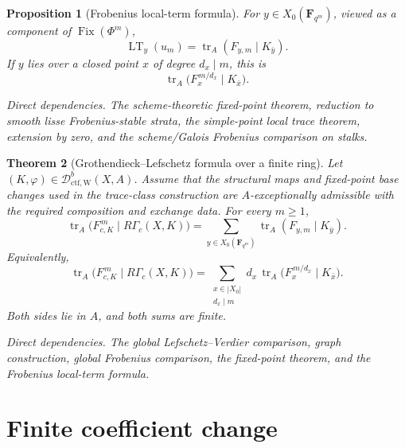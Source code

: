 \documentclass[10pt]{article}
\newtheorem{theorem}{Theorem}[section]
\newtheorem{proposition}[theorem]{Proposition}
\theoremstyle{definition}
\newcommand{\DctfW}{\mathcal D^b_{\mathrm{ctf},\mathrm W}}
\newcommand{\Fix}{\operatorname{Fix}}
\newcommand{\RGammac}{R\Gamma_c}
\newcommand{\depends}[1]{\par\smallskip\noindent\textit{Direct dependencies.} #1\par}
\begin{document}
\begin{proposition}[Frobenius local-term formula]
For \(y\in X_0(\mathbf F_{q^m})\), viewed as a component of
\(\Fix(\Phi^m)\),
\[
 \operatorname{LT}_y(u_m)=
 \operatorname{tr}_A(F_{y,m}\mid K_{\bar y}).
\]
If \(y\) lies over a closed point \(x\) of degree \(d_x\mid m\), this is
\[
 \operatorname{tr}_A
 \bigl(F_x^{\,m/d_x}\mid K_{\bar x}\bigr).
\]
\depends{The scheme-theoretic fixed-point theorem, reduction to smooth lisse
Frobenius-stable strata, the simple-point local trace theorem, extension by
zero, and the scheme/Galois Frobenius comparison on stalks.}
\end{proposition}

\begin{theorem}[Grothendieck--Lefschetz formula over a finite ring]
Let \((K,\varphi)\in\DctfW(X,A)\).  Assume that the structural maps and
fixed-point base changes used in the trace-class construction are
\(A\)-exceptionally admissible with the required composition and exchange
data.  For every \(m\geq1\),
\[
 \boxed{
 \operatorname{tr}_A
 \bigl(F_{c,K}^{\,m}\mid\RGammac(X,K)\bigr)
 =
 \sum_{y\in X_0(\mathbf F_{q^m})}
 \operatorname{tr}_A(F_{y,m}\mid K_{\bar y}).}
\]
Equivalently,
\[
 \operatorname{tr}_A
 \bigl(F_{c,K}^{\,m}\mid\RGammac(X,K)\bigr)
 =
 \sum_{\substack{x\in|X_0|\\d_x\mid m}}
 d_x\,
 \operatorname{tr}_A
 \bigl(F_x^{\,m/d_x}\mid K_{\bar x}\bigr).
\]
Both sides lie in \(A\), and both sums are finite.
\depends{The global Lefschetz--Verdier comparison, graph construction,
global Frobenius comparison, the fixed-point theorem, and the Frobenius
local-term formula.}
\end{theorem}

\section{Finite coefficient change}
\end{document}
